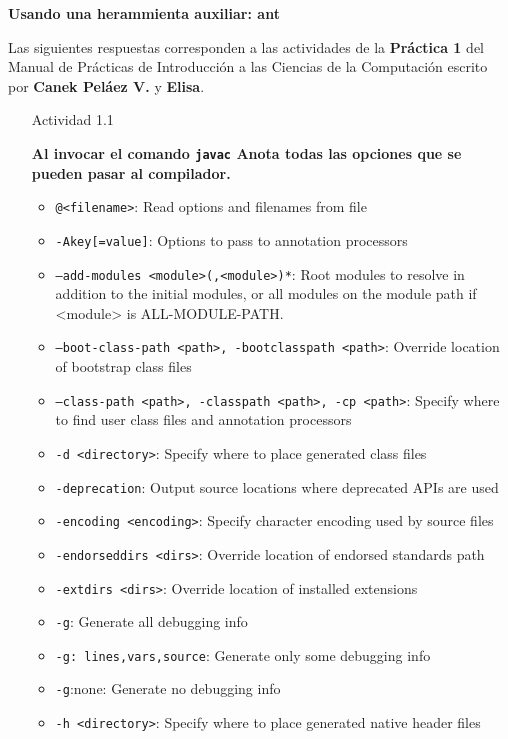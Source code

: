 \documentclass[11pt,letterpaper]{article}
\begin{document}
{\Large \bfseries Usando una herammienta auxiliar: ant \par}

Las siguientes respuestas corresponden a las actividades de la \textbf{Práctica 1}
del Manual de Prácticas de Introducción a las Ciencias de la Computación escrito
por \textbf{Canek Peláez V.} y \textbf{Elisa}.

\begin{enumerate}
    \item [Actividad 1.1] {\bfseries Al invocar el comando \texttt{javac} Anota todas las opciones que se pueden pasar al compilador. \par}
        \begin{itemize}
            \item \texttt{@<filename>}: Read options and filenames from file
            \item \texttt{-Akey[=value]}: Options to pass to annotation processors
            \item \texttt{--add-modules <module>(,<module>)*}: Root modules to resolve in addition to the initial modules, or all modules on the module path if <module> is ALL-MODULE-PATH.
            \item \texttt{--boot-class-path <path>, -bootclasspath <path>}: Override location of bootstrap class files
            \item \texttt{--class-path <path>, -classpath <path>, -cp <path>}: Specify where to find user class files and annotation processors
            \item \texttt{-d <directory>}: Specify where to place generated class files
            \item \texttt{-deprecation}: Output source locations where deprecated APIs are used
            \item \texttt{-encoding <encoding>}: Specify character encoding used by source files
            \item \texttt{-endorseddirs <dirs>}: Override location of endorsed standards path
            \item \texttt{-extdirs <dirs>}: Override location of installed extensions
            \item \texttt{-g}: Generate all debugging info
            \item \texttt{-g: lines,vars,source}: Generate only some debugging info
            \item \texttt{-g}:none: Generate no debugging info
            \item \texttt{-h <directory>}: Specify where to place generated native header files

\end{itemize}
\end{enumerate}
\end{document}
